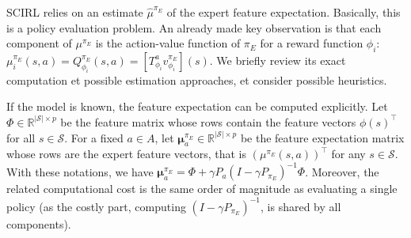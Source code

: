 \documentclass[english,utf8]{./hermes-journal}
\newcommand{\s}{\mathcal{S}}
\newcommand{\A}{\mathcal{A}}
\newcommand{\Mu}{\boldsymbol{\mu}}
\begin{document}
SCIRL relies on an estimate $\hat{\mu}^{\pi_E}$ of the expert
feature expectation. Basically, this is a policy evaluation problem.
An already made key observation is that each component of
$\mu^{\pi_E}$ is the action-value function of $\pi_E$ for a reward
function $\phi_i$: $\mu_i^{\pi_E}(s,a) = Q^{\pi_E}_{\phi_i}(s,a) =
[T^a_{\phi_i} v^{\pi_E}_{\phi_i}](s)$. We briefly review its exact
computation et possible estimation approaches, et consider
possible heuristics.

If the model is known, the feature expectation can be computed
explicitly. Let $\Phi\in\mathbb{R}^{|\s|\times p}$ be the feature
matrix whose rows contain the feature vectors $\phi(s)^\top$ for all
$s\in\s$.
%
%
For a fixed $a\in A$, let $\Mu^{\pi_E}_a \in\mathbb{R}^{|\s|\times
p}$ be the feature expectation matrix whose rows are the expert
feature vectors, that is $(\mu^{\pi_E}(s,a))^\top$ for any $s\in\s$.
With these notations, we have $\Mu_a^{\pi_E} = \Phi + \gamma
P_a(I-\gamma P_{\pi_E})^{-1} \Phi$.
Moreover, the related computational cost is the same order of
magnitude as evaluating a single policy (as the costly part,
computing $(I-\gamma P_{\pi_E})^{-1}$, is shared by all components).
\end{document}
